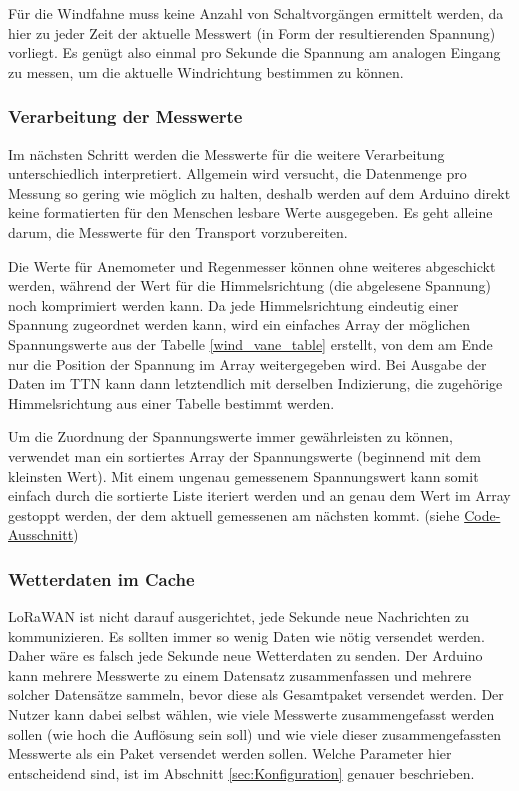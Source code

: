 \documentclass[12pt]{article}
\begin{document}
      Für die Windfahne muss keine Anzahl von Schaltvorgängen ermittelt werden, da hier zu jeder Zeit der aktuelle Messwert (in Form der resultierenden Spannung) vorliegt.
      Es genügt also einmal pro Sekunde die Spannung am analogen Eingang zu messen, um die aktuelle Windrichtung bestimmen zu können.



      \subsubsection{Verarbeitung der Messwerte} \label{processing_records}
      Im nächsten Schritt werden die Messwerte für die weitere Verarbeitung unterschiedlich interpretiert.
      Allgemein wird versucht, die Datenmenge pro Messung so gering wie möglich zu halten, deshalb werden auf dem Arduino direkt keine formatierten für den Menschen lesbare Werte ausgegeben.
      Es geht alleine darum, die Messwerte für den Transport vorzubereiten.

      Die Werte für Anemometer und Regenmesser können ohne weiteres abgeschickt werden, während der Wert für die Himmelsrichtung (die abgelesene Spannung) noch komprimiert werden kann.
      Da jede Himmelsrichtung eindeutig einer Spannung zugeordnet werden kann, wird ein einfaches Array der möglichen Spannungswerte aus der Tabelle \underline{\ref{wind_vane_table}} erstellt, von dem am Ende nur die Position der Spannung im Array weitergegeben wird.
      Bei Ausgabe der Daten im TTN kann dann letztendlich mit derselben Indizierung, die zugehörige Himmelsrichtung aus einer Tabelle bestimmt werden.

      Um die Zuordnung der Spannungswerte immer gewährleisten zu können, verwendet man ein sortiertes Array der Spannungswerte (beginnend mit dem kleinsten Wert).
      Mit einem ungenau gemessenem Spannungswert kann somit einfach durch die sortierte Liste iteriert werden und an genau dem Wert im Array gestoppt werden, der dem aktuell gemessenen am nächsten kommt.
      (siehe \href{https://github.com/HTWDD-RN/LoRaWAN-Wetterstation-SEN-15901/blob/21bf650ae923dba30d39e37641f77aa94702a314/src/lora_weather_station/lora_weather_station.ino#L87}{Code-Ausschnitt})
      


      \subsubsection{Wetterdaten im Cache} \label{cache}
      LoRaWAN ist nicht darauf ausgerichtet, jede Sekunde neue Nachrichten zu kommunizieren.
      Es sollten immer so wenig Daten wie nötig versendet werden.
      Daher wäre es falsch jede Sekunde neue Wetterdaten zu senden.
      Der Arduino kann mehrere Messwerte zu einem Datensatz zusammenfassen und mehrere solcher Datensätze sammeln, bevor diese als Gesamtpaket versendet werden.
      Der Nutzer kann dabei selbst wählen, wie viele Messwerte zusammengefasst werden sollen (wie hoch die Auflösung sein soll) und wie viele dieser zusammengefassten Messwerte als ein Paket versendet werden sollen.
      Welche Parameter hier entscheidend sind, ist im Abschnitt \underline{\ref{sec:Konfiguration}} genauer beschrieben.
\end{document}
